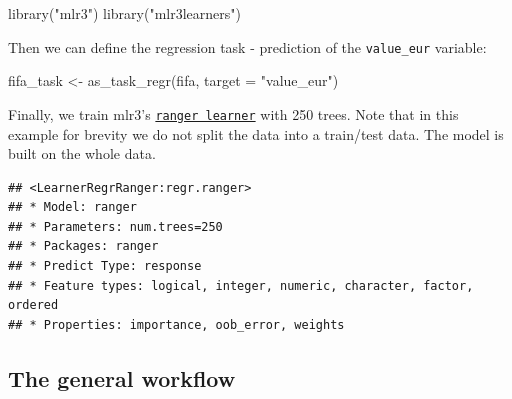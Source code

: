 \documentclass[
]{scrbook}
\newenvironment{Shaded}{\begin{snugshade}}{\end{snugshade}}
\newcommand{\AttributeTok}[1]{\textcolor[rgb]{0.77,0.63,0.00}{#1}}
\newcommand{\DecValTok}[1]{\textcolor[rgb]{0.00,0.00,0.81}{#1}}
\newcommand{\FunctionTok}[1]{\textcolor[rgb]{0.00,0.00,0.00}{#1}}
\newcommand{\NormalTok}[1]{#1}
\newcommand{\OtherTok}[1]{\textcolor[rgb]{0.56,0.35,0.01}{#1}}
\newcommand{\SpecialCharTok}[1]{\textcolor[rgb]{0.00,0.00,0.00}{#1}}
\newcommand{\StringTok}[1]{\textcolor[rgb]{0.31,0.60,0.02}{#1}}
\renewenvironment{Shaded} {\begin{snugshade}\small} {\end{snugshade}}
\begin{document}
\begin{Shaded}
\begin{Highlighting}[]
\FunctionTok{library}\NormalTok{(}\StringTok{"mlr3"}\NormalTok{)}
\FunctionTok{library}\NormalTok{(}\StringTok{"mlr3learners"}\NormalTok{)}
\end{Highlighting}
\end{Shaded}

Then we can define the regression task - prediction of the \texttt{value\_eur} variable:

\begin{Shaded}
\begin{Highlighting}[]
\NormalTok{fifa\_task }\OtherTok{\textless{}{-}} \FunctionTok{as\_task\_regr}\NormalTok{(fifa, }\AttributeTok{target =} \StringTok{"value\_eur"}\NormalTok{)}
\end{Highlighting}
\end{Shaded}

Finally, we train mlr3's \href{https://mlr3learners.mlr-org.com/reference/mlr_learners_regr.ranger.html}{\texttt{ranger\ learner}} with 250 trees. Note that in this example for brevity we do not split the data into a train/test data. The model is built on the whole data.

\begin{Shaded}
\end{Shaded}

\begin{verbatim}
## <LearnerRegrRanger:regr.ranger>
## * Model: ranger
## * Parameters: num.trees=250
## * Packages: ranger
## * Predict Type: response
## * Feature types: logical, integer, numeric, character, factor, ordered
## * Properties: importance, oob_error, weights
\end{verbatim}

\hypertarget{interpretability-architecture}{%
\subsection{The general workflow}\label{interpretability-architecture}}
\end{document}
